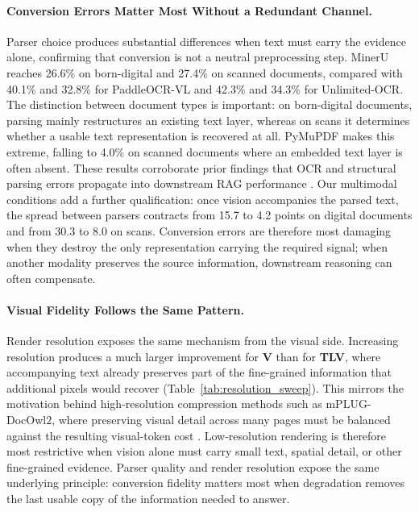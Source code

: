 \paragraph{Conversion Errors Matter Most Without a Redundant Channel.} Parser choice produces substantial differences when text must carry the evidence alone, confirming that conversion is not a neutral preprocessing step. MinerU reaches 26.6\% on born-digital and 27.4\% on scanned documents, compared with 40.1\% and 32.8\% for PaddleOCR-VL and 42.3\% and 34.3\% for Unlimited-OCR. The distinction between document types is important: on born-digital documents, parsing mainly restructures an existing text layer, whereas on scans it determines whether a usable text representation is recovered at all. PyMuPDF makes this extreme, falling to 4.0\% on scanned documents where an embedded text layer is often absent. These results corroborate prior findings that OCR and structural parsing errors propagate into downstream RAG performance \citep{zhang2025ocr,sun2026when}. Our multimodal conditions add a further qualification: once vision accompanies the parsed text, the spread between parsers contracts from 15.7 to 4.2 points on digital documents and from 30.3 to 8.0 on scans. Conversion errors are therefore most damaging when they destroy the only representation carrying the required signal; when another modality preserves the source information, downstream reasoning can often compensate.



\paragraph{Visual Fidelity Follows the Same Pattern.} Render resolution exposes the same mechanism from the visual side. Increasing resolution produces a much larger improvement for \textbf{V} than for \textbf{TLV}, where accompanying text already preserves part of the fine-grained information that additional pixels would recover (Table~\ref{tab:resolution_sweep}). This mirrors the motivation behind high-resolution compression methods such as mPLUG-DocOwl2, where preserving visual detail across many pages must be balanced against the resulting visual-token cost \citep{hu2025mplug}. Low-resolution rendering is therefore most restrictive when vision alone must carry small text, spatial detail, or other fine-grained evidence. Parser quality and render resolution expose the same underlying principle: conversion fidelity matters most when degradation removes the last usable copy of the information needed to answer.

